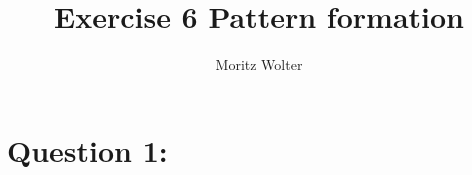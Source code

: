 \documentclass{article}
\begin{document}
\title{Exercise 6 Pattern formation}
\author{Moritz Wolter}

\maketitle


\section{Question 1:}
\end{document}
